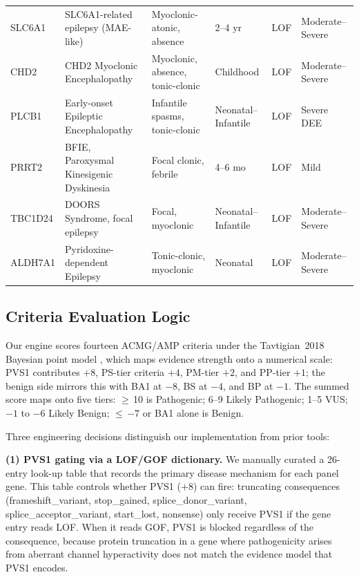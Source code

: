 \documentclass[12pt,a4paper]{article}
\begin{document}
\begin{table}[H]
\begin{center}
\begin{tabular}{p{1.1cm}p{3.8cm}p{3.8cm}p{2.2cm}p{0.8cm}p{2.2cm}}
SLC6A1  & SLC6A1-related epilepsy (MAE-like)          & Myoclonic-atonic, absence               & 2--4 yr               & LOF     & Moderate--Severe \\
CHD2    & CHD2 Myoclonic Encephalopathy               & Myoclonic, absence, tonic-clonic        & Childhood             & LOF     & Moderate--Severe \\
PLCB1   & Early-onset Epileptic Encephalopathy        & Infantile spasms, tonic-clonic          & Neonatal--Infantile   & LOF     & Severe DEE \\
PRRT2   & BFIE, Paroxysmal Kinesigenic Dyskinesia     & Focal clonic, febrile                   & 4--6 mo               & LOF     & Mild \\
TBC1D24 & DOORS Syndrome, focal epilepsy              & Focal, myoclonic                        & Neonatal--Infantile   & LOF     & Moderate--Severe \\
ALDH7A1 & Pyridoxine-dependent Epilepsy               & Tonic-clonic, myoclonic                 & Neonatal              & LOF     & Moderate--Severe \\
\bottomrule
\end{tabular}
\end{center}
\end{table}

\subsection{Criteria Evaluation Logic}

Our engine scores fourteen ACMG/AMP criteria under the
Tavtigian~2018 Bayesian point model \cite{tavtigian2018}, which
maps evidence strength onto a numerical scale: PVS1 contributes
$+8$, PS-tier criteria $+4$, PM-tier $+2$, and PP-tier $+1$; the
benign side mirrors this with BA1 at $-8$, BS at $-4$, and BP at
$-1$. The summed score maps onto five tiers: $\geq$\,10 is
Pathogenic; 6--9 Likely Pathogenic; 1--5 VUS; $-1$ to $-6$
Likely Benign; $\leq$\,$-7$ or BA1 alone is Benign.

Three engineering decisions distinguish our implementation from
prior tools:

\textbf{(1) PVS1 gating via a LOF/GOF dictionary.}
We manually curated a 26-entry look-up table that records the
primary disease mechanism for each panel gene. This table controls
whether PVS1 ($+8$) can fire: truncating consequences
(frameshift\_variant, stop\_gained, splice\_donor\_variant,
splice\_acceptor\_variant, start\_lost, nonsense) only receive
PVS1 if the gene entry reads LOF. When it reads GOF, PVS1 is
blocked regardless of the consequence, because protein truncation
in a gene where pathogenicity arises from aberrant channel
hyperactivity does not match the evidence model that PVS1 encodes.
\end{document}
